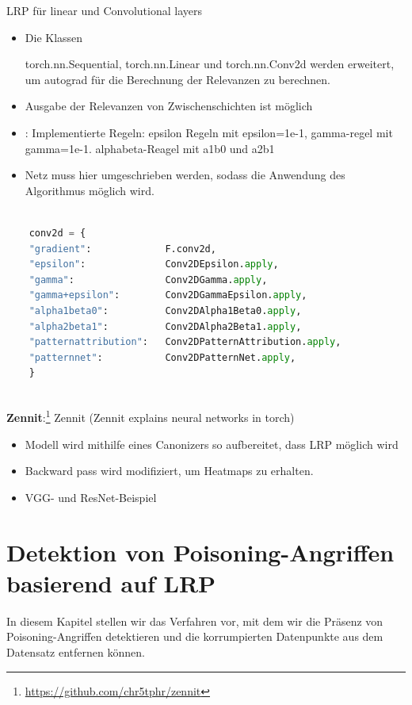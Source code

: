 \documentclass[11pt,a4paper]{article}
\numberwithin{equation}{section}
\begin{document}
	
	
	\noindent LRP für linear und Convolutional layers
	
	\begin{itemize}
		\item Die Klassen
		
		torch.nn.Sequential, torch.nn.Linear und torch.nn.Conv2d werden erweitert, um autograd für die Berechnung der Relevanzen zu berechnen.
		
		\item Ausgabe der Relevanzen von Zwischenschichten ist möglich
		\item: Implementierte Regeln: epsilon Regeln mit epsilon=1e-1, gamma-regel mit gamma=1e-1. alphabeta-Reagel mit a1b0 und a2b1
		\item Netz muss hier umgeschrieben werden, sodass die Anwendung des Algorithmus möglich wird.
	\end{itemize}
	
	\begin{lstlisting}[language=Python, caption=Implementierte Regeln fhvilshoj]
	
	conv2d = {
	"gradient":             F.conv2d,
	"epsilon":              Conv2DEpsilon.apply,
	"gamma":                Conv2DGamma.apply,
	"gamma+epsilon":        Conv2DGammaEpsilon.apply,
	"alpha1beta0":          Conv2DAlpha1Beta0.apply,
	"alpha2beta1":          Conv2DAlpha2Beta1.apply,
	"patternattribution":   Conv2DPatternAttribution.apply,
	"patternnet":           Conv2DPatternNet.apply,
	}
	
	\end{lstlisting}
	
	\noindent \textbf{Zennit}:\footnote{\url{https://github.com/chr5tphr/zennit}}
	Zennit (Zennit explains neural networks in torch) 
	\begin{itemize}
		\item Modell wird mithilfe eines Canonizers so aufbereitet, dass LRP möglich wird
		\item Backward pass wird modifiziert, um Heatmaps zu erhalten.
		\item VGG- und ResNet-Beispiel
	\end{itemize}
	\section{Detektion von Poisoning-Angriffen basierend auf LRP} 
	In diesem Kapitel stellen wir das Verfahren vor, mit dem wir die Präsenz von Poisoning-Angriffen detektieren und die korrumpierten Datenpunkte aus dem Datensatz entfernen können.
	
\end{document}
